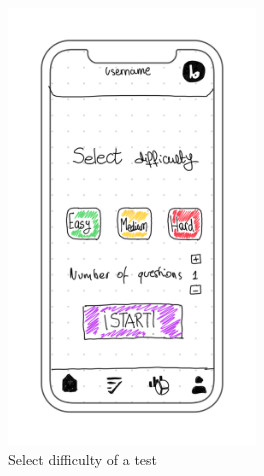 \begin{figure}[H]
\begin{subfigure}[T]{0.32\textwidth}
        \includegraphics[width=0.72\textwidth]{assets/screens/quiz/common/Select difficulty.png}
        \caption{Select difficulty of a test}
        \label{fig:design_screen_select_dif}
    \end{subfigure}
    \hfill
    \begin{subfigure}[T]{0.32\textwidth}
        \centering

\end{subfigure}
\end{figure}
